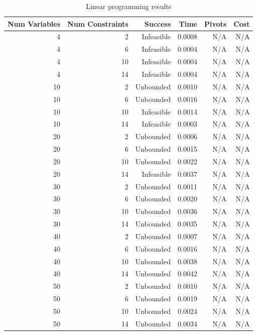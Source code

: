 \begin{table}[ht]
    \centering
    \begin{tabular}{rrrrrr}
        \toprule
        Num Variables & Num Constraints & Success & Time & Pivots & Cost \\
        \midrule
        4 & 2 & Infeasible & 0.0008 & N/A & N/A \\
		4 & 6 & Infeasible & 0.0004 & N/A & N/A \\
		4 & 10 & Infeasible & 0.0004 & N/A & N/A \\
		4 & 14 & Infeasible & 0.0004 & N/A & N/A \\
		10 & 2 & Unbounded & 0.0010 & N/A & N/A \\
		10 & 6 & Unbounded & 0.0016 & N/A & N/A \\
		10 & 10 & Infeasible & 0.0014 & N/A & N/A \\
		10 & 14 & Infeasible & 0.0003 & N/A & N/A \\
		20 & 2 & Unbounded & 0.0006 & N/A & N/A \\
		20 & 6 & Unbounded & 0.0015 & N/A & N/A \\
		20 & 10 & Unbounded & 0.0022 & N/A & N/A \\
		20 & 14 & Infeasible & 0.0037 & N/A & N/A \\
		30 & 2 & Unbounded & 0.0011 & N/A & N/A \\
		30 & 6 & Unbounded & 0.0020 & N/A & N/A \\
		30 & 10 & Unbounded & 0.0036 & N/A & N/A \\
		30 & 14 & Unbounded & 0.0035 & N/A & N/A \\
		40 & 2 & Unbounded & 0.0007 & N/A & N/A \\
		40 & 6 & Unbounded & 0.0016 & N/A & N/A \\
		40 & 10 & Unbounded & 0.0038 & N/A & N/A \\
		40 & 14 & Unbounded & 0.0042 & N/A & N/A \\
		50 & 2 & Unbounded & 0.0010 & N/A & N/A \\
		50 & 6 & Unbounded & 0.0019 & N/A & N/A \\
		50 & 10 & Unbounded & 0.0024 & N/A & N/A \\
		50 & 14 & Unbounded & 0.0034 & N/A & N/A \\
        \bottomrule
    \end{tabular}
    \caption{Linear programming results}
    \label{tab:lp-results}
\end{table}